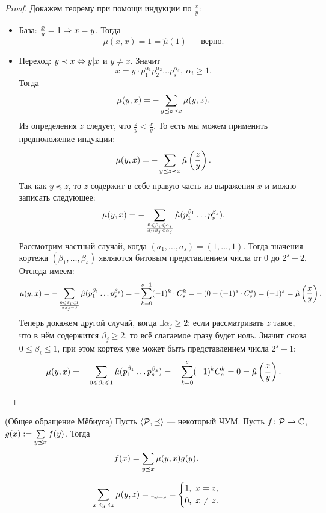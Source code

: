 \begin{proof}
	Докажем теорему при помощи индукции по $\frac{x}{y}$:
	\begin{itemize}
		\item База: $\frac{x}{y} = 1 \Rightarrow x = y$. Тогда
		\[
			\mu(x, x) = 1 = \hat{\mu}(1) \text{ --- верно}.
		\]
		
		\item Переход: $y \prec x \Leftrightarrow y | x$ и $y \neq x$. Значит
		\[
			x = y \cdot p_1^{\alpha_1} p_2^{\alpha_2} \ldots p_s^{\alpha_s},\ \alpha_i \ge 1.
		\]
		Тогда
		\[
			\mu(y, x) = -\sum\limits_{y \preceq z \prec x} \mu(y, z).
		\]
		Из определения $z$ следует, что $\frac{z}{y} < \frac{x}{y}$. То есть мы можем применить предположение индукции:
		\[
			\mu(y, x) = -\sum\limits_{y \preceq z \prec x} \hat{\mu}\left(\frac{z}{y}\right).
		\]
		Так как $y \preceq z$, то $z$ содержит в себе правую часть из выражения $x$ и можно записать следующее:
		\[
			\mu(y, x) = -\sum\limits_{{0 \leqslant \beta_i \leqslant \alpha_i} \over {\exists j : \beta_j < \alpha_j}} \hat{\mu}(p_1^{\beta_1} \ldots p_s^{\beta_s}).
		\]
		Рассмотрим частный случай, когда $(a_1, \ldots, a_s) = (1, \ldots, 1)$. Тогда значения кортежа $(\beta_1, \ldots, \beta_s)$ являются битовым представлением числа от $0$ до $2^s - 2$. Отсюда имеем:
		\[
			\mu(y, x) = -\sum\limits_{{0 \leqslant \beta_i \leqslant 1} \over {\exists \beta_j = 0}} \hat{\mu}(p_1^{\beta_1} \ldots p_s^{\beta_s}) = -\sum\limits_{k = 0}^{s - 1} (-1)^k \cdot C_s^k = - \left(0 - (-1)^s \cdot C_s^s\right) = (-1)^s = \hat{\mu}\left(\frac{x}{y}\right).
		\]
		Теперь докажем другой случай, когда $\exists \alpha_j \ge 2$: если рассматривать $z$ такое, что в нём содержится $\beta_j \ge 2$, то всё слагаемое сразу будет ноль. Значит снова $0 \le \beta_i \le 1$, при этом кортеж уже может быть представлением числа $2^s - 1$:
		\[
			\mu(y, x) = -\sum\limits_{{0 \leqslant \beta_i \leqslant 1}} \hat{\mu}(p_1^{\beta_1} \ldots p_s^{\beta_s}) = -\sum\limits_{k = 0}^s (-1)^k C_s^k = 0 = \hat{\mu}\left(\frac{x}{y}\right).
		\]
	\end{itemize}
\end{proof}

\begin{theorem} (Общее обращение Мёбиуса) \label{globMebius}
	Пусть $\langle\mathcal{P}, \preceq\rangle$ --- некоторый ЧУМ. Пусть $f\colon \mathcal{P} \rightarrow \mathbb{C}$, $g(x) := \sum\limits_{y \preceq x} f(y)$. Тогда
	\[
		f(x) = \sum\limits_{y \preceq x} \mu(y, x) g(y).
	\]
\end{theorem}

\begin{lemma}
	\[
		\sum\limits_{x \preceq y \preceq z} \mu(y, z) = \mathbb{I}_{x = z} = \left\{\begin{aligned}
			&{1,\ x = z,}
			\\
			&{0,\ x \neq z.}
		\end{aligned}\right.
	\]
\end{lemma}

